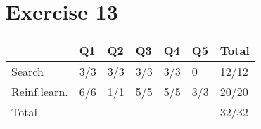 \section{Exercise 13}
\begin{table}[H]
\begin{tabular}{lllllll}
\hline
             & Q1  & Q2  & Q3  & Q4  & Q5  & Total \\ \hline
Search       & 3/3 & 3/3 & 3/3 & 3/3 & 0   & 12/12 \\
Reinf.learn. & 6/6 & 1/1 & 5/5 & 5/5 & 3/3 & 20/20 \\ \hline
Total        &     &     &     &     &     & 32/32 \\ \hline
\end{tabular}
\end{table}
